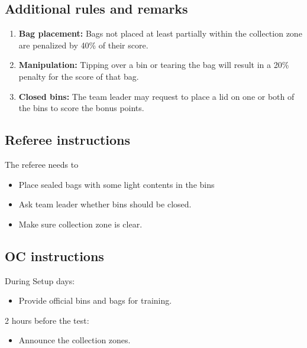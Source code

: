 \subsection{Additional rules and remarks}
\begin{enumerate}[nosep]
	\item \textbf{Bag placement:} Bags not placed at least partially within the collection zone are penalized by 40\% of their score.
	\item \textbf{Manipulation:}  Tipping over a bin or tearing the bag will result in a 20\% penalty for the score of that bag.
	\item \textbf{Closed bins:} The team leader may request to place a lid on one or both of the bins to score the bonus points.

\end{enumerate}

\subsection{Referee instructions}

The referee needs to
\begin{itemize}
	\item Place sealed bags with some light contents in the bins
	\item Ask team leader whether bins should be closed.
	\item Make sure collection zone is clear.
\end{itemize}

\subsection{OC instructions}
During Setup days:
\begin{itemize}
	\item Provide official bins and bags for training.
\end{itemize}

2 hours before the test:
\begin{itemize}
	\item Announce the collection zones.
\end{itemize}

% 


